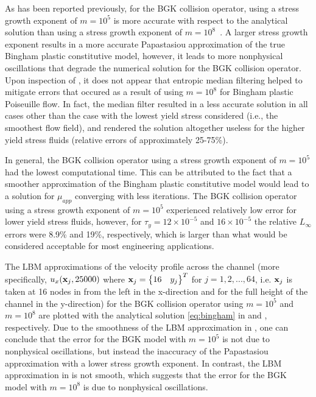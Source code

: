 As has been reported previously, for the BGK collision operator, using a stress growth exponent of $m = 10^5$ is more accurate with respect to the analytical solution than using a stress growth exponent of $m = 10^8$~\cite{chen2014simulations}.
A larger stress growth exponent results in a more accurate Papastasiou approximation of the true Bingham plastic constitutive model, however, it leads to more nonphysical oscillations that degrade the numerical solution for the BGK collision operator.
Upon inspection of , it does not appear that entropic median filtering helped to mitigate errors that occured as a result of using $m = 10^8$ for Bingham plastic Poiseuille flow.
In fact, the median filter resulted in a less accurate solution in all cases other than the case with the lowest yield stress considered (i.e., the smoothest flow field), and rendered the solution altogether useless for the higher yield stress fluids (relative errors of approximately 25-75\%).

In general, the BGK collision operator using a stress growth exponent of $m = 10^5$ had the lowest computational time.
This can be attributed to the fact that a smoother approximation of the Bingham plastic constitutive model would lead to a solution for $\mu_{app}$ converging with less iterations.
The BGK collision operator using a stress growth exponent of $m = 10^5$ experienced relatively low error for lower yield stress fluids, however, for $\tau_y = 12 \times 10^{-5}$ and $16 \times 10^{-5}$ the relative $L_\infty$ errors were 8.9\% and 19\%, respectively, which is larger than what would be considered acceptable for most engineering applications.

The LBM approximations of the velocity profile across the channel (more specifically, $u_x(\mathbf{x}_j, 25000)$ where $\mathbf{x}_j = \begin{Bmatrix}16 & y_j\end{Bmatrix}^T$ for $j = 1, 2, ..., 64$, i.e. $\mathbf{x}_j$ is taken at 16 nodes in from the left in the x-direction and for the full height of the channel in the y-direction) for the BGK collision operator using $m = 10^5$ and $m = 10^8$ are plotted with the analytical solution \eqref{eq:bingham} in  and , respectively.
Due to the smoothness of the LBM approximation in , one can conclude that the error for the BGK model with $m = 10^5$ is not due to nonphysical oscillations, but instead the inaccuracy of the Papastasiou approximation with a lower stress growth exponent.
In contrast, the LBM approximation in  is not smooth, which suggests that the error for the BGK model with $m = 10^8$ is due to nonphysical oscillations.

